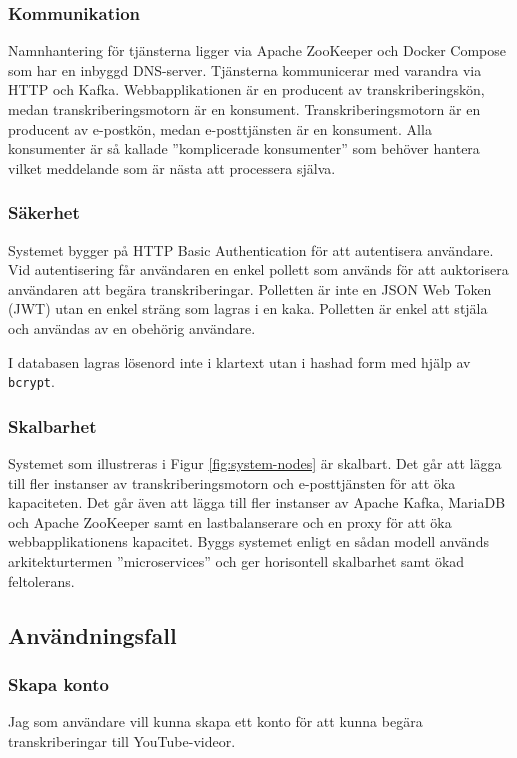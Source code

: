 \subsubsection{Kommunikation}
Namnhantering för tjänsterna ligger via Apache ZooKeeper och Docker Compose som har
en inbyggd DNS-server. Tjänsterna kommunicerar med varandra via HTTP och Kafka.
Webbapplikationen är en producent av transkriberingskön, medan transkriberingsmotorn är en
konsument. Transkriberingsmotorn är en producent av e-postkön, medan e-posttjänsten
är en konsument. Alla konsumenter är så kallade ''komplicerade konsumenter'' som
behöver hantera vilket meddelande som är nästa att processera själva.

\subsubsection{Säkerhet}
Systemet bygger på HTTP Basic Authentication för att autentisera användare. Vid
autentisering får användaren en enkel pollett som används för att auktorisera
användaren att begära transkriberingar. Polletten är inte en JSON Web Token
(JWT) utan en enkel sträng som lagras i en kaka. Polletten är enkel att stjäla
och användas av en obehörig användare. 

I databasen lagras lösenord inte i klartext utan i hashad form med hjälp av
\verb|bcrypt|. 

\subsubsection{Skalbarhet}
Systemet som illustreras i Figur \ref{fig:system-nodes} är skalbart. Det går
att lägga till fler instanser av transkriberingsmotorn och e-posttjänsten för
att öka kapaciteten. Det går även att lägga till fler instanser av Apache Kafka,
MariaDB och Apache ZooKeeper samt en lastbalanserare och en proxy för att öka
webbapplikationens kapacitet. Byggs systemet enligt en sådan modell används
arkitekturtermen ''microservices'' och ger horisontell skalbarhet samt ökad
feltolerans. 

\subsection{Användningsfall}

\subsubsection{Skapa konto}
Jag som användare vill kunna skapa ett konto för att kunna begära
transkriberingar till YouTube-videor.

